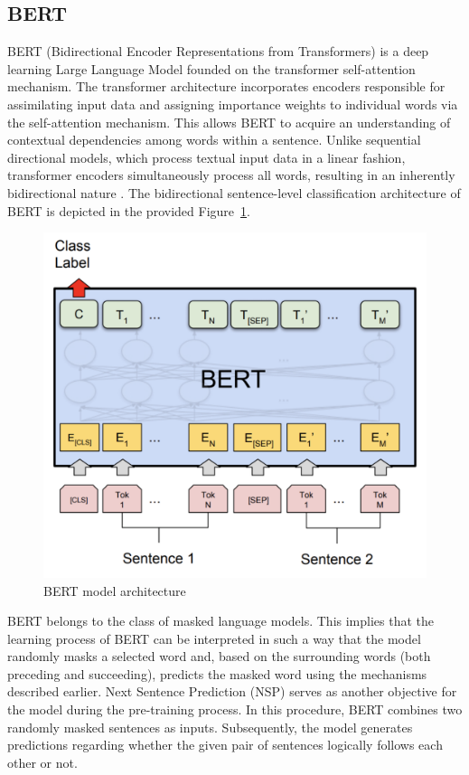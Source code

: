 \subsection{BERT}
BERT (Bidirectional Encoder Representations from Transformers) is a deep learning Large Language Model founded on the transformer self-attention mechanism. The transformer architecture incorporates encoders responsible for assimilating input data and assigning importance weights to individual words via the self-attention mechanism. This allows BERT to acquire an understanding of contextual dependencies among words within a sentence. Unlike sequential directional models, which process textual input data in a linear fashion, transformer encoders simultaneously process all words, resulting in an inherently bidirectional nature \autocite{Vaswani2017}. The bidirectional sentence-level classification architecture of BERT is depicted in the provided Figure~\ref{bert_architecture}.

\begin{figure}[hbt!]
\centering
\includegraphics[width=0.6\linewidth]{bert_architecture.png}
\caption{BERT model architecture \autocite{Devlin2018}}
\label{bert_architecture}
\end{figure}

BERT belongs to the class of masked language models. This implies that the learning process of BERT can be interpreted in such a way that the model randomly masks a selected word and, based on the surrounding words (both preceding and succeeding), predicts the masked word using the mechanisms described earlier. 
Next Sentence Prediction (NSP) serves as another objective for the model during the pre-training process. In this procedure, BERT combines two randomly masked sentences as inputs. Subsequently, the model generates predictions regarding whether the given pair of sentences logically follows each other or not.

